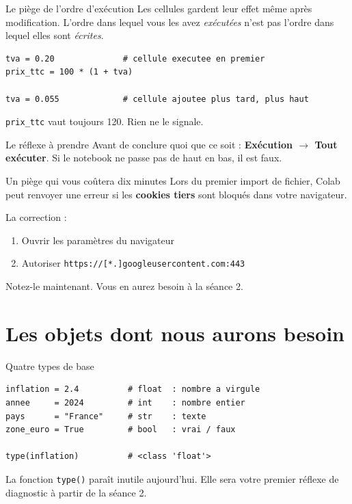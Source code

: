 \documentclass[10pt,aspectratio=169]{beamer}
\begin{document}
\begin{frame}[fragile]{Le piège de l'ordre d'exécution}
Les cellules gardent leur effet même après modification. L'ordre dans lequel vous les avez \emph{exécutées} n'est pas l'ordre dans lequel elles sont \emph{écrites}.

\vspace{1em}
\begin{lstlisting}
tva = 0.20              # cellule executee en premier
prix_ttc = 100 * (1 + tva)

tva = 0.055             # cellule ajoutee plus tard, plus haut
\end{lstlisting}

\vspace{0.8em}
\texttt{prix\_ttc} vaut toujours 120. Rien ne le signale.

\vspace{1em}
\begin{alertblock}{Le réflexe à prendre}
Avant de conclure quoi que ce soit : \textbf{Exécution $\rightarrow$ Tout exécuter}. Si le notebook ne passe pas de haut en bas, il est faux.
\end{alertblock}
\end{frame}

\begin{frame}{Un piège qui vous coûtera dix minutes}
Lors du premier import de fichier, Colab peut renvoyer une erreur si les \textbf{cookies tiers} sont bloqués dans votre navigateur.

\vspace{1.2em}
La correction :
\begin{enumerate}
  \item Ouvrir les paramètres du navigateur
  \item Autoriser \texttt{https://[*.]googleusercontent.com:443}
\end{enumerate}

\vspace{1.2em}
Notez-le maintenant. Vous en aurez besoin à la séance 2.
\end{frame}

\section{Les objets dont nous aurons besoin}

\begin{frame}[fragile]{Quatre types de base}
\begin{lstlisting}
inflation = 2.4          # float  : nombre a virgule
annee     = 2024         # int    : nombre entier
pays      = "France"     # str    : texte
zone_euro = True         # bool   : vrai / faux

type(inflation)          # <class 'float'>
\end{lstlisting}

\vspace{1.5em}
La fonction \texttt{type()} paraît inutile aujourd'hui. Elle sera votre premier réflexe de diagnostic à partir de la séance 2.
\end{frame}
\end{document}
